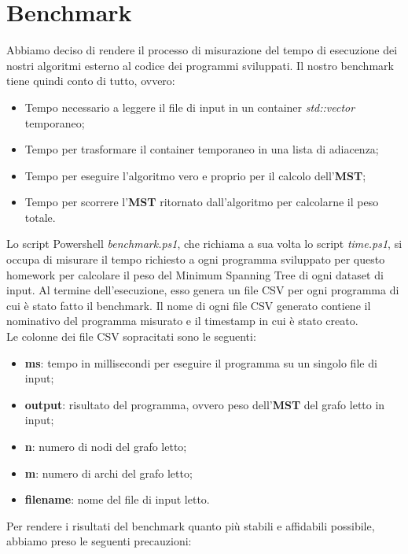 \section{Benchmark}
\label{cap:benchmark-process}

Abbiamo deciso di rendere il processo di misurazione del tempo di esecuzione dei nostri algoritmi esterno al codice dei programmi sviluppati.
Il nostro benchmark tiene quindi conto di tutto, ovvero:

\begin{itemize}
    \item Tempo necessario a leggere il file di input in un container \textit{std::vector} temporaneo;
    \item Tempo per trasformare il container temporaneo in una lista di adiacenza;
    \item Tempo per eseguire l'algoritmo vero e proprio per il calcolo dell'\textbf{MST};
    \item Tempo per scorrere l'\textbf{MST} ritornato dall'algoritmo per calcolarne il peso totale.
\end{itemize}

\noindent Lo script Powershell \textit{benchmark.ps1}, che richiama a sua volta lo script \textit{time.ps1}, si occupa di misurare il tempo richiesto a ogni programma sviluppato per questo homework per calcolare il peso del Minimum Spanning Tree di ogni dataset di input. Al termine dell'esecuzione, esso genera un file CSV per ogni programma di cui è stato fatto il benchmark. Il nome di ogni file CSV generato contiene il nominativo del programma misurato e il timestamp in cui è stato creato. \\

\noindent Le colonne dei file CSV sopracitati sono le seguenti:

\begin{itemize}
    \item \textbf{ms}: tempo in millisecondi per eseguire il programma su un singolo file di input;
    \item \textbf{output}: risultato del programma, ovvero peso dell'\textbf{MST} del grafo letto in input;
    \item \textbf{n}: numero di nodi del grafo letto;
    \item \textbf{m}: numero di archi del grafo letto;
    \item \textbf{filename}: nome del file di input letto.
\end{itemize}

\noindent Per rendere i risultati del benchmark quanto più stabili e affidabili possibile, abbiamo preso le seguenti precauzioni:


